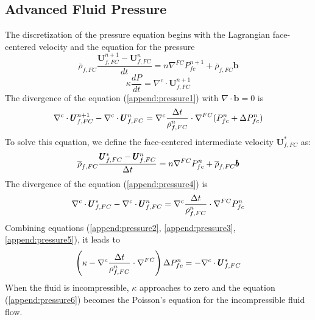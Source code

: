 \documentclass[preprint,12pt]{elsarticle}
\begin{document}
\subsection{\textsf{Advanced Fluid Pressure}}
The discretization of the pressure equation begins with the Lagrangian face-centered velocity and the equation for the pressure
%
\begin{equation}
 \label{append:pressure1}
  \overline{\rho}_{f,FC} \frac{\pmb{U}_{f,FC}^{n+1} - \pmb{U}_{f,FC}^{n}}{dt} 
  = n \nabla^{FC} P_{fc}^{n+1} + \overline{\rho}_{f,FC} \pmb{b}
\end{equation}
%
%
\begin{equation}
\label{append:pressure2}
  \kappa \frac{dP}{dt} = \nabla^c \cdot \pmb{U}_{f,FC}^{n+1}
\end{equation}
%
The divergence of the equation (\ref{append:pressure1}) with $ \nabla \cdot \pmb{b} = 0$ is
%
\begin{equation}
\label{append:pressure3}
  \nabla^c \cdot \pmb{U}_{f,FC}^{n+1} - \nabla^c \cdot \pmb{U}_{f,FC}^{n}
  = \nabla^c \frac{\Delta{t}}{\rho_{f,FC}^n} \cdot \nabla^{FC} (P_{fc}^{n} + \Delta P_{fc}^{n})
\end{equation}
%
To solve this equation, we define the face-centered intermediate velocity $ \pmb{U}_{f,FC}^{*}$ as:
%
\begin{equation}
 \label{append:pressure4}
  \overline{\rho}_{f,FC} \frac{\pmb{U}_{f,FC}^{*} - \pmb{U}_{f,FC}^{n}}{\Delta{t}} 
  = n \nabla^{FC} P_{fc}^{n} + \overline{\rho}_{f,FC} \pmb{b}
\end{equation}
%
%
The divergence of the equation (\ref{append:pressure4}) is
%
\begin{equation}
\label{append:pressure5}
  \nabla^c \cdot \pmb{U}_{f,FC}^{*} - \nabla^c \cdot \pmb{U}_{f,FC}^{n}
  = \nabla^c \frac{\Delta{t}}{\rho_{f,FC}^n} \cdot \nabla^{FC} P_{fc}^{n}
\end{equation}
%
Combining equations (\ref{append:pressure2}, \ref{append:pressure3}, \ref{append:pressure5}), it leads to
\begin{equation}
\label{append:pressure6}
  \left(  
   \kappa - \nabla^c \frac{\Delta{t}}{\rho_{f,FC}^n} \cdot \nabla^{FC}
  \right) \Delta P_{fc}^{n} = - \nabla^c \cdot \pmb{U}_{f,FC}^{*}
\end{equation}
When the fluid is incompressible, $\kappa$ approaches to zero and the equation (\ref{append:pressure6}) becomes the Poisson's equation for the incompressible fluid flow.
%
%
\end{document}
